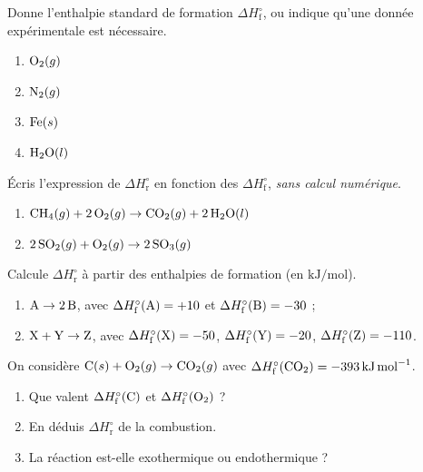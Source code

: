 \documentclass[11pt,a4paper]{article}
\begin{document}
\begin{exo}
Donne l'enthalpie standard de formation $\Delta H^\circ_{\text{f}}$, ou indique qu'une donnée expérimentale est nécessaire.
\begin{enumerate}[label=\alph*)]
  \item $\ce{O2}(g)$
  \item $\ce{N2}(g)$
  \item $\ce{Fe}(s)$
  \item $\ce{H2O}(l)$
\end{enumerate}
\end{exo}

\begin{exo}
Écris l'expression de $\Delta H^\circ_{\text{r}}$ en fonction des $\Delta H^\circ_{\text{f}}$, \emph{sans calcul numérique}.
\begin{enumerate}[label=\alph*)]
  \item $\ce{CH4}(g) + 2\,\ce{O2}(g) \rightarrow \ce{CO2}(g) + 2\,\ce{H2O}(l)$
  \item $2\,\ce{SO2}(g) + \ce{O2}(g) \rightarrow 2\,\ce{SO3}(g)$
\end{enumerate}
\end{exo}

\begin{exo}
Calcule $\Delta H^\circ_{\text{r}}$ à partir des enthalpies de formation (en $\si{\kilo\joule\per\mol}$).
\begin{enumerate}[label=\alph*)]
  \item $\ce{A} \rightarrow 2\,\ce{B}$, avec $\Delta H^\circ_{\text{f}}(\ce{A})=+10$ et $\Delta H^\circ_{\text{f}}(\ce{B})=-30$ ;
  \item $\ce{X} + \ce{Y} \rightarrow \ce{Z}$, avec $\Delta H^\circ_{\text{f}}(\ce{X})=-50$, $\Delta H^\circ_{\text{f}}(\ce{Y})=-20$, $\Delta H^\circ_{\text{f}}(\ce{Z})=-110$.
\end{enumerate}
\end{exo}

\begin{exo}
On considère $\ce{C}(s) + \ce{O2}(g) \rightarrow \ce{CO2}(g)$ avec $\Delta H^\circ_{\text{f}}(\ce{CO2})=\qty{-393}{\kilo\joule\per\mol}$.
\begin{enumerate}[label=\alph*)]
  \item Que valent $\Delta H^\circ_{\text{f}}(\ce{C})$ et $\Delta H^\circ_{\text{f}}(\ce{O2})$ ?
  \item En déduis $\Delta H^\circ_{\text{r}}$ de la combustion.
  \item La réaction est-elle exothermique ou endothermique ?
\end{enumerate}
\end{exo}
\end{document}
